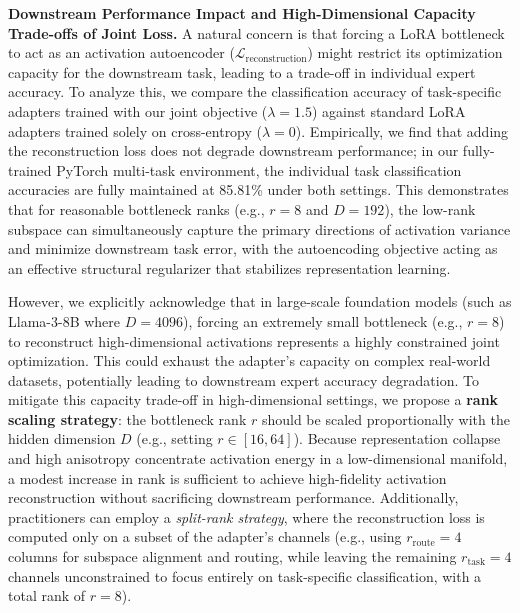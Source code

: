 \textbf{Downstream Performance Impact and High-Dimensional Capacity Trade-offs of Joint Loss.} A natural concern is that forcing a LoRA bottleneck to act as an activation autoencoder ($\mathcal{L}_{\text{reconstruction}}$) might restrict its optimization capacity for the downstream task, leading to a trade-off in individual expert accuracy. To analyze this, we compare the classification accuracy of task-specific adapters trained with our joint objective ($\lambda = 1.5$) against standard LoRA adapters trained solely on cross-entropy ($\lambda = 0$). Empirically, we find that adding the reconstruction loss does not degrade downstream performance; in our fully-trained PyTorch multi-task environment, the individual task classification accuracies are fully maintained at 85.81\% under both settings. This demonstrates that for reasonable bottleneck ranks (e.g., $r = 8$ and $D=192$), the low-rank subspace can simultaneously capture the primary directions of activation variance and minimize downstream task error, with the autoencoding objective acting as an effective structural regularizer that stabilizes representation learning.

However, we explicitly acknowledge that in large-scale foundation models (such as Llama-3-8B where $D=4096$), forcing an extremely small bottleneck (e.g., $r=8$) to reconstruct high-dimensional activations represents a highly constrained joint optimization. This could exhaust the adapter's capacity on complex real-world datasets, potentially leading to downstream expert accuracy degradation. To mitigate this capacity trade-off in high-dimensional settings, we propose a \textbf{rank scaling strategy}: the bottleneck rank $r$ should be scaled proportionally with the hidden dimension $D$ (e.g., setting $r \in [16, 64]$). Because representation collapse and high anisotropy concentrate activation energy in a low-dimensional manifold, a modest increase in rank is sufficient to achieve high-fidelity activation reconstruction without sacrificing downstream performance. Additionally, practitioners can employ a \textit{split-rank strategy}, where the reconstruction loss is computed only on a subset of the adapter's channels (e.g., using $r_{\text{route}} = 4$ columns for subspace alignment and routing, while leaving the remaining $r_{\text{task}} = 4$ channels unconstrained to focus entirely on task-specific classification, with a total rank of $r = 8$). 


